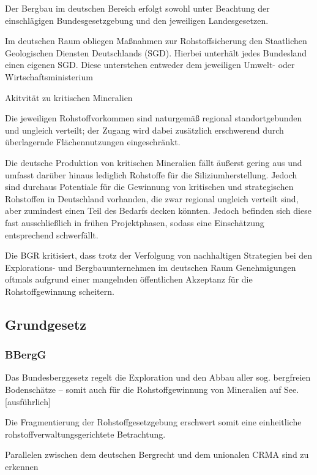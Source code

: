 \documentclass[12pt,a4paper,oneside]{book} %
\begin{document}
Der Bergbau im deutschen Bereich erfolgt sowohl unter Beachtung der einschlägigen Bundesgesetzgebung und den jeweiligen Landesgesetzen.

Im deutschen Raum obliegen Maßnahmen zur Rohstoffsicherung den Staatlichen Geologischen Diensten Deutschlands (SGD). Hierbei unterhält jedes Bundesland einen eigenen SGD. Diese unterstehen entweder dem jeweiligen Umwelt- oder Wirtschaftsministerium

Akitvität zu kritischen Mineralien

Die jeweiligen Rohstoffvorkommen sind naturgemäß regional standortgebunden und ungleich verteilt; der Zugang wird dabei zusätzlich erschwerend durch überlagernde Flächennutzungen eingeschränkt.\autocite{Bericht zur Rohstoffsituation in Deutschland 2023, S. 17}

Die deutsche Produktion von kritischen Mineralien fällt äußerst gering aus und umfasst darüber hinaus lediglich Rohstoffe für die Siliziumherstellung.\autocite{Commodity TopNews 73, S. 4} Jedoch sind durchaus Potentiale für die Gewinnung von kritischen und strategischen Rohstoffen in Deutschland vorhanden, die zwar regional ungleich verteilt sind, aber zumindest einen Teil des Bedarfs decken könnten. Jedoch befinden sich diese fast ausschließlich in frühen Projektphasen,\autocite{Commodity TopNews 73, S. 10-11} sodass eine Einschätzung entsprechend schwerfällt.

Die BGR kritisiert, dass trotz der Verfolgung von nachhaltigen Strategien bei den Explorations- und Bergbauunternehmen im deutschen Raum Genehmigungen oftmals aufgrund einer mangelnden öffentlichen Akzeptanz für die Rohstoffgewinnung scheitern.\autocite{Commodity TopNews 73, S. 14}

\subsection{Grundgesetz}

\subsubsection{BBergG}
Das Bundesberggesetz regelt die Exploration und den Abbau aller sog. bergfreien Bodenschätze -- somit auch für die Rohstoffgewinnung von Mineralien auf See.[ausführlich]\autocite{Jenisch II}

Die Fragmentierung der Rohstoffgesetzgebung erschwert somit eine einheitliche rohstoffverwaltungsgerichtete Betrachtung.

Parallelen zwischen dem deutschen Bergrecht und dem unionalen CRMA sind zu erkennen
\end{document}
